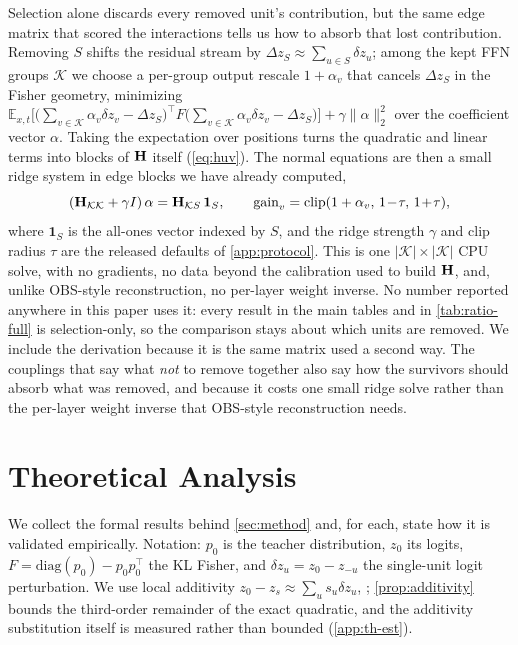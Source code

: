 Selection alone discards every removed unit's contribution, but the same edge matrix that scored
the interactions tells us how to absorb that lost contribution. Removing $S$ shifts the residual stream by
$\Delta z_S\approx\sum_{u\in S}\delta z_u$; among the kept FFN groups $\mathcal K$ we choose a per-group
output rescale $1+\alpha_v$ that cancels $\Delta z_S$ in the Fisher geometry, minimizing
$\mathbb{E}_{x,t}\big[\big(\textstyle\sum_{v\in\mathcal K}\alpha_v\delta z_v-\Delta z_S\big)^{\!\top} F \big(\textstyle\sum_{v\in\mathcal K}\alpha_v\delta z_v-\Delta z_S\big)\big]+\gamma\|\alpha\|_2^2$
over the coefficient vector $\alpha$. Taking the expectation over positions turns the quadratic and linear terms into blocks of $\mathbf{H}$
itself (\cref{eq:huv}). The normal equations are then a small ridge system in edge blocks we have
already computed,
\begin{equation}
(\mathbf{H}_{\mathcal K\mathcal K}+\gamma I)\,\alpha=\mathbf{H}_{\mathcal K S}\,\mathbf 1_S,
\qquad
\text{gain}_v=\mathrm{clip}(1+\alpha_v,\,1\!-\!\tau,\,1\!+\!\tau),
\label{eq:comp}
\end{equation}
where $\mathbf 1_S$ is the all-ones vector indexed by $S$, and the ridge strength $\gamma$ and clip
radius $\tau$ are the released defaults of \cref{app:protocol}.
This is one $|\mathcal K|\times|\mathcal K|$ CPU solve, with no gradients, no data beyond the calibration
used to build $\mathbf{H}$, and, unlike OBS-style reconstruction, no per-layer weight inverse. No number reported
anywhere in this paper uses it: every result in the main tables and in \cref{tab:ratio-full} is
selection-only, so the comparison stays about which units are removed. We include the derivation
because it is the same matrix used a second way. The couplings that say what \emph{not} to remove
together also say how the survivors should absorb what was removed, and because it
costs one small ridge solve rather than the per-layer weight inverse that OBS-style reconstruction
needs.

\section{Theoretical Analysis}
\label{app:theory}

We collect the formal results behind \cref{sec:method} and, for each, state how it is validated
empirically. Notation: $p_0$ is the teacher distribution, $z_0$ its logits,
$F=\mathrm{diag}(p_0)-p_0p_0^\top$ the KL Fisher, and $\delta z_u=z_0-z_{-u}$ the single-unit logit
perturbation. We use local additivity $z_0-z_s\approx\sum_u s_u\delta z_u$, ; \cref{prop:additivity} bounds the third-order
remainder of the exact quadratic, and the additivity substitution itself is measured rather than
bounded (\cref{app:th-est}).
